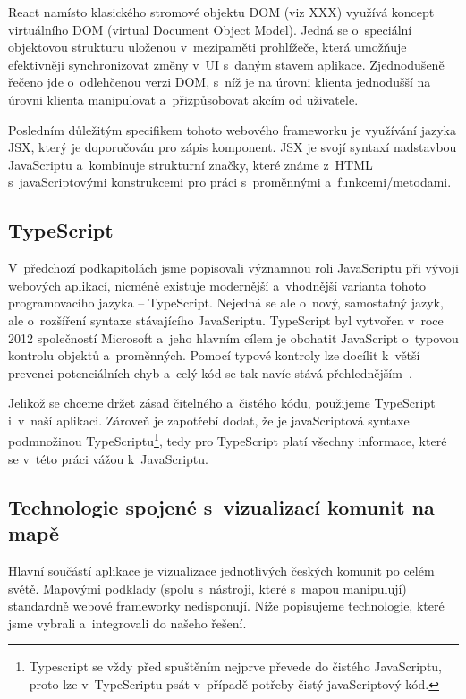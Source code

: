 React namísto klasického stromové objektu DOM (viz XXX) využívá koncept virtuálního DOM (virtual Document Object Model). Jedná se o~speciální objektovou strukturu uloženou v~mezipaměti prohlížeče, která umožňuje efektivněji synchronizovat změny v~UI s~daným stavem aplikace. Zjednodušeně řečeno jde o~odlehčenou verzi DOM, s~níž je na úrovni klienta jednodušší na úrovni klienta manipulovat a~přizpůsobovat akcím od uživatele.

Posledním důležitým specifikem tohoto webového frameworku je využívání jazyka JSX, který je doporučován pro zápis komponent. JSX je svojí syntaxí nadstavbou JavaScriptu a~kombinuje strukturní značky, které známe z~HTML s~javaScriptovými konstrukcemi pro práci s~proměnnými a~funkcemi/metodami.

\hypertarget{typescript}{%
\subsection{TypeScript}\label{typescript}}

V~předchozí podkapitolách jsme popisovali významnou roli JavaScriptu při vývoji webových aplikací, nicméně existuje modernější a~vhodnější varianta tohoto programovacího jazyka -- TypeScript. Nejedná se ale o~nový, samostatný jazyk, ale o~rozšíření syntaxe stávajícího JavaScriptu. TypeScript byl vytvořen v~roce 2012 společností Microsoft a~jeho hlavním cílem je obohatit JavaScript o~typovou kontrolu objektů a~proměnných. Pomocí typové kontroly lze docílit k~větší prevenci potenciálních chyb a~celý kód se tak navíc stává přehlednějším~\parencite{typescript}.

Jelikož se chceme držet zásad čitelného a~čistého kódu, použijeme TypeScript i~v~naší aplikaci. Zároveň je zapotřebí dodat, že je javaScriptová syntaxe podmnožinou TypeScriptu\footnote{Typescript se vždy před spuštěním nejprve převede do čistého JavaScriptu, proto lze v~TypeScriptu psát v~případě potřeby čistý javaScriptový kód.}, tedy pro TypeScript platí všechny informace, které se v~této práci vážou k~JavaScriptu.

\hypertarget{technologie-spojenuxe9-s-vizualizacuxed-komunit-na-mapux11b}{%
\subsection{Technologie spojené s~vizualizací komunit na mapě}\label{technologie-spojenuxe9-s-vizualizacuxed-komunit-na-mapux11b}}

Hlavní součástí aplikace je vizualizace jednotlivých českých komunit po celém světě. Mapovými podklady (spolu s~nástroji, které s~mapou manipulují) standardně webové frameworky nedisponují. Níže popisujeme technologie, které jsme vybrali a~integrovali do našeho řešení.

